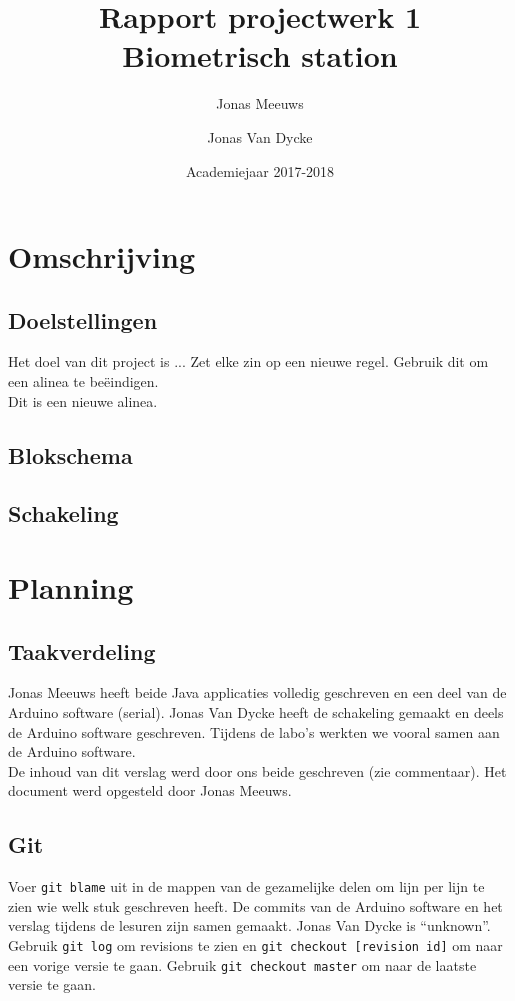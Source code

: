 \documentclass[a4paper]{report}
\title{Rapport projectwerk 1\\ Biometrisch station}
\author{Jonas Meeuws \and Jonas Van Dycke}
\date{Academiejaar 2017-2018}
\begin{document}
\maketitle
\tableofcontents

\chapter{Omschrijving}
\section{Doelstellingen}
Het doel van dit project is ...
Zet elke zin op een nieuwe regel.
Gebruik dit om een alinea te beëindigen.\\

Dit is een nieuwe alinea.

\section{Blokschema}
\section{Schakeling}

\chapter{Planning}
\section{Taakverdeling}
Jonas Meeuws heeft beide Java applicaties volledig geschreven en een deel van de Arduino software (serial).
Jonas Van Dycke heeft de schakeling gemaakt en deels de Arduino software geschreven.
Tijdens de labo's werkten we vooral samen aan de Arduino software.\\
De inhoud van dit verslag werd door ons beide geschreven (zie commentaar).
Het document werd opgesteld door Jonas Meeuws.

\section{Git}
Voer \verb!git blame! uit in de mappen van de gezamelijke delen om lijn per lijn te zien wie welk stuk geschreven heeft.
De commits van de Arduino software en het verslag tijdens de lesuren zijn samen gemaakt.
Jonas Van Dycke is ``unknown''.
Gebruik \verb!git log! om revisions te zien en \verb!git checkout [revision id]! om naar een vorige versie te gaan.
Gebruik \verb!git checkout master! om naar de laatste versie te gaan.
\end{document}
